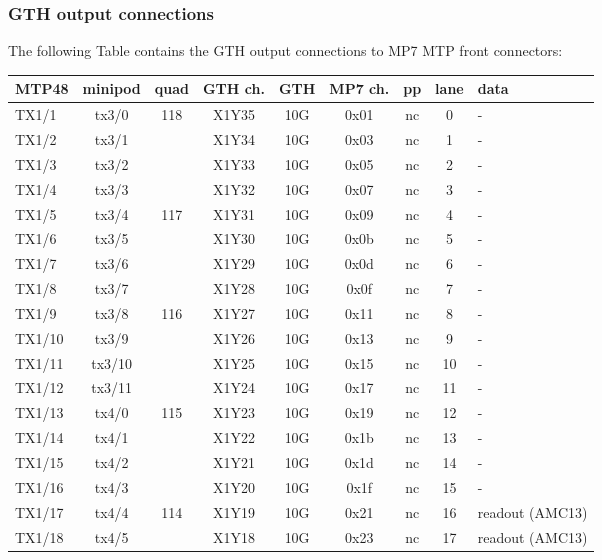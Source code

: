 \subsubsection{GTH output connections}\label{sec:app:gth_o_conn}

The following Table contains the GTH output connections to MP7 MTP front connectors:

\begin{longtable}{|l|c|c|c|c|c|c|c|l|}
\hline
\textbf{MTP48}& \textbf{minipod}& \textbf{quad}& \textbf{GTH ch.}& \textbf{GTH}& \textbf{MP7 ch.} &\textbf{pp}& \textbf{lane}& \textbf{data}\\
\hline
\hline
\endhead
TX1/1  & tx3/0  & 118 & X1Y35 & 10G & 0x01 & nc & 0  & -\\\hline
TX1/2  & tx3/1  &     & X1Y34 & 10G & 0x03 & nc & 1  & -\\\hline
TX1/3  & tx3/2  &     & X1Y33 & 10G & 0x05 & nc & 2  & -\\\hline
TX1/4  & tx3/3  &     & X1Y32 & 10G & 0x07 & nc & 3  & -\\\hline
TX1/5  & tx3/4  & 117 & X1Y31 & 10G & 0x09 & nc & 4  & -\\\hline
TX1/6  & tx3/5  &     & X1Y30 & 10G & 0x0b & nc & 5  & -\\\hline
TX1/7  & tx3/6  &     & X1Y29 & 10G & 0x0d & nc & 6  & -\\\hline
TX1/8  & tx3/7  &     & X1Y28 & 10G & 0x0f & nc & 7  & -\\\hline
TX1/9  & tx3/8  & 116 & X1Y27 & 10G & 0x11 & nc & 8  & -\\\hline
TX1/10 & tx3/9  &     & X1Y26 & 10G & 0x13 & nc & 9  & -\\\hline
TX1/11 & tx3/10 &     & X1Y25 & 10G & 0x15 & nc & 10 & -\\\hline
TX1/12 & tx3/11 &     & X1Y24 & 10G & 0x17 & nc & 11 & -\\\hline
TX1/13 & tx4/0  & 115 & X1Y23 & 10G & 0x19 & nc & 12 & -\\\hline
TX1/14 & tx4/1  &     & X1Y22 & 10G & 0x1b & nc & 13 & -\\\hline
TX1/15 & tx4/2  &     & X1Y21 & 10G & 0x1d & nc & 14 & -\\\hline
TX1/16 & tx4/3  &     & X1Y20 & 10G & 0x1f & nc & 15 & -\\\hline
TX1/17 & tx4/4  & 114 & X1Y19 & 10G & 0x21 & nc & 16 & readout (AMC13)\\\hline
TX1/18 & tx4/5  &     & X1Y18 & 10G & 0x23 & nc & 17 & readout (AMC13)\\\hline

\end{longtable}
